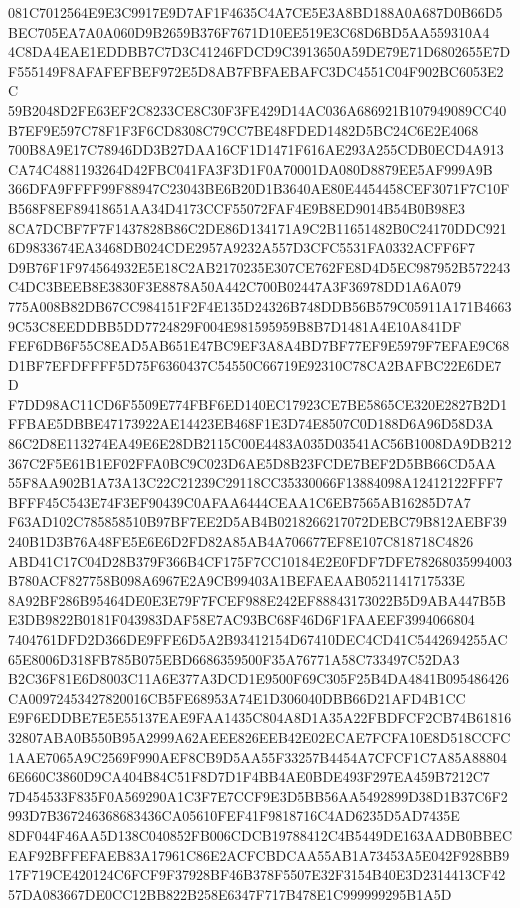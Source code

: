\documentclass[UTF8,fontset=fandol,zihao=-4,a4paper]{ctexart}
\begin{document}
{{081C7012564E9E3C9917E9D7AF1F4635C4A7CE5E3A8BD188A0A687D0B66D5BEC705EA7A0A060D9B2659B376F7671D10EE519E3C68D6BD5AA559310A4
4C8DA4EAE1EDDBB7C7D3C41246FDCD9C3913650A59DE79E71D6802655E7DF555149F8AFAFEFBEF972E5D8AB7FBFAEBAFC3DC4551C04F902BC6053E2C
59B2048D2FE63EF2C8233CE8C30F3FE429D14AC036A686921B107949089CC40B7EF9E597C78F1F3F6CD8308C79CC7BE48FDED1482D5BC24C6E2E4068
700B8A9E17C78946DD3B27DAA16CF1D1471F616AE293A255CDB0ECD4A913CA74C4881193264D42FBC041FA3F3D1F0A70001DA080D8879EE5AF999A9B
366DFA9FFFF99F88947C23043BE6B20D1B3640AE80E4454458CEF3071F7C10FB568F8EF89418651AA34D4173CCF55072FAF4E9B8ED9014B54B0B98E3
8CA7DCBF7F7F1437828B86C2DE86D134171A9C2B11651482B0C24170DDC9216D9833674EA3468DB024CDE2957A9232A557D3CFC5531FA0332ACFF6F7
D9B76F1F974564932E5E18C2AB2170235E307CE762FE8D4D5EC987952B572243C4DC3BEEB8E3830F3E8878A50A442C700B02447A3F36978DD1A6A079
775A008B82DB67CC984151F2F4E135D24326B748DDB56B579C05911A171B46639C53C8EEDDBB5DD7724829F004E981595959B8B7D1481A4E10A841DF
FEF6DB6F55C8EAD5AB651E47BC9EF3A8A4BD7BF77EF9E5979F7EFAE9C68D1BF7EFDFFFF5D75F6360437C54550C66719E92310C78CA2BAFBC22E6DE7D
F7DD98AC11CD6F5509E774FBF6ED140EC17923CE7BE5865CE320E2827B2D1FFBAE5DBBE47173922AE14423EB468F1E3D74E8507C0D188D6A96D58D3A
86C2D8E113274EA49E6E28DB2115C00E4483A035D03541AC56B1008DA9DB212367C2F5E61B1EF02FFA0BC9C023D6AE5D8B23FCDE7BEF2D5BB66CD5AA
55F8AA902B1A73A13C22C21239C29118CC35330066F13884098A12412122FFF7BFFF45C543E74F3EF90439C0AFAA6444CEAA1C6EB7565AB16285D7A7
F63AD102C785858510B97BF7EE2D5AB4B0218266217072DEBC79B812AEBF39240B1D3B76A48FE5E6E6D2FD82A85AB4A706677EF8E107C818718C4826
ABD41C17C04D28B379F366B4CF175F7CC10184E2E0FDF7DFE78268035994003B780ACF827758B098A6967E2A9CB99403A1BEFAEAAB0521141717533E
8A92BF286B95464DE0E3E79F7FCEF988E242EF88843173022B5D9ABA447B5BE3DB9822B0181F043983DAF58E7AC93BC68F46D6F1FAAEEF3994066804
7404761DFD2D366DE9FFE6D5A2B93412154D67410DEC4CD41C5442694255AC65E8006D318FB785B075EBD6686359500F35A76771A58C733497C52DA3
B2C36F81E6D8003C11A6E377A3DCD1E9500F69C305F25B4DA4841B095486426CA00972453427820016CB5FE68953A74E1D306040DBB66D21AFD4B1CC
E9F6EDDBE7E5E55137EAE9FAA1435C804A8D1A35A22FBDFCF2CB74B6181632807ABA0B550B95A2999A62AEEE826EEB42E02ECAE7FCFA10E8D518CCFC
1AAE7065A9C2569F990AEF8CB9D5AA55F33257B4454A7CFCF1C7A85A888046E660C3860D9CA404B84C51F8D7D1F4BB4AE0BDE493F297EA459B7212C7
7D454533F835F0A569290A1C3F7E7CCF9E3D5BB56AA5492899D38D1B37C6F2993D7B367246368683436CA05610FEF41F9818716C4AD6235D5AD7435E
8DF044F46AA5D138C040852FB006CDCB19788412C4B5449DE163AADB0BBECEAF92BFFEFAEB83A17961C86E2ACFCBDCAA55AB1A73453A5E042F928BB9
17F719CE420124C6FCF9F37928BF46B378F5507E32F3154B40E3D2314413CF4257DA083667DE0CC12BB822B258E6347F717B478E1C999999295B1A5D
}}
\end{document}
